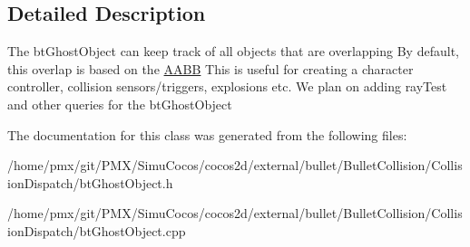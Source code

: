 \subsection{Detailed Description}
The bt\+Ghost\+Object can keep track of all objects that are overlapping By default, this overlap is based on the \hyperlink{classAABB}{A\+A\+BB} This is useful for creating a character controller, collision sensors/triggers, explosions etc. We plan on adding ray\+Test and other queries for the bt\+Ghost\+Object 

The documentation for this class was generated from the following files\+:\begin{DoxyCompactItemize}
\item 
/home/pmx/git/\+P\+M\+X/\+Simu\+Cocos/cocos2d/external/bullet/\+Bullet\+Collision/\+Collision\+Dispatch/bt\+Ghost\+Object.\+h\item 
/home/pmx/git/\+P\+M\+X/\+Simu\+Cocos/cocos2d/external/bullet/\+Bullet\+Collision/\+Collision\+Dispatch/bt\+Ghost\+Object.\+cpp\end{DoxyCompactItemize}
